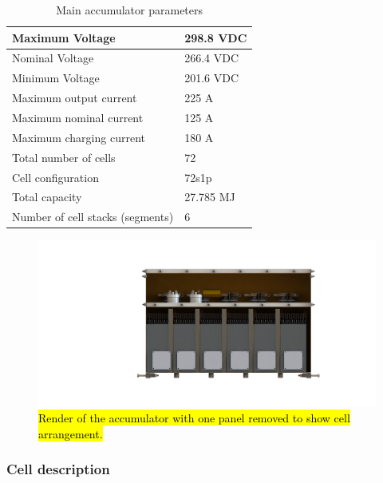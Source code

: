 \documentclass{article}
\begin{document}
	\begin{table}[H]
	    \centering
	    \begin{tabular}{|l|l|}
	        \hline
	        Maximum Voltage & 298.8 VDC \\ \hline
	        Nominal Voltage & 266.4 VDC \\ \hline
	        Minimum Voltage & 201.6 VDC \\ \hline
	        Maximum output current & 225 A \\ \hline
	        Maximum nominal current & 125 A \\ \hline
	        Maximum charging current & 180 A \\ \hline
	        Total number of cells & 72 \\ \hline
	        Cell configuration & 72s1p \\ \hline
	        Total capacity & 27.785 MJ \\ \hline
	        Number of cell stacks (segments) & 6 \\ \hline
	    \end{tabular}
	    \caption{Main accumulator parameters}
	    \label{tab:batterytable}
	\end{table}

\begin{figure}[H]
\centering
\includegraphics[width=1\textwidth]{accumulator_front}
\caption{\hl{Render of the accumulator with one panel removed to show cell arrangement.}}
\label{fig:accumulator_hero}
\end{figure}

\subsubsection{Cell description}\label{accumulator_cell_description}
\end{document}
